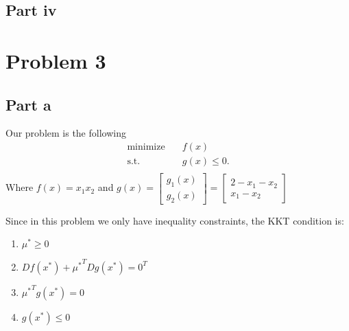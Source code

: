 \documentclass{article}
\begin{document}
\subsection*{Part iv}
\section*{Problem 3}
\subsection*{Part a}
Our problem is the following
\[
\begin{aligned}
\text{minimize}\quad & f(x)\\
\textrm{s.t.} \quad &g(x)\leq 0.\\
\end{aligned}
\]
Where $f(x)=x_1x_2$ and $g(x)=\begin{bmatrix}
g_1(x)\\
g_2(x)
\end{bmatrix}=\begin{bmatrix}
2-x_1-x_2\\
x_1-x_2
\end{bmatrix}$

Since in this problem we only have inequality constraints, the KKT condition
is:
\begin{enumerate}[I]
\item $\mu^*\geq0$ \label{muPositive}
\item $Df(x^*)+{\mu^*}^TDg(x^*)=0^T$ \label{KKT}
\item ${\mu^*}^Tg(x^*)=0$ \label{muTg}
\item $g(x^*)\leq0$ \label{gNegative}
\end{enumerate}
\end{document}
